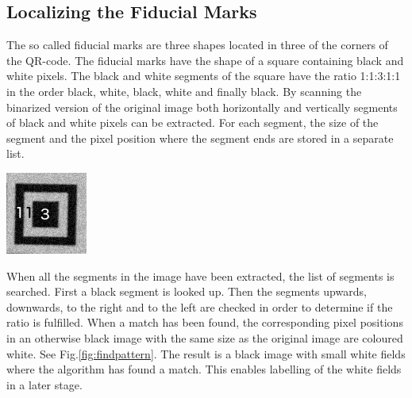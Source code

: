\documentclass[12pt,a4paper]{article}
\newenvironment{Figure}
  {\par\medskip\noindent\minipage{\linewidth}}
  {\endminipage\par\medskip}
\begin{document}
\subsection{Localizing the Fiducial Marks}
The so called fiducial marks are three shapes located in three of the corners of the QR-code. The fiducial marks have the shape of a square containing black and white pixels. The black and white segments of the square have the ratio 1:1:3:1:1 \cite{belussi} in the order black, white, black, white and finally black. By scanning the binarized version of the original image both horizontally and vertically segments of black and white pixels can be extracted. For each segment, the size of the segment and the pixel position where the segment ends are stored in a separate list. 
\begin{Figure}
  \centering
    \includegraphics[width=0.5\linewidth]{./img/Fiducial.png}
\end{Figure}

When all the segments in the image have been extracted, the list of segments is searched. First a black segment is looked up. Then the segments upwards, downwards, to the right and to the left are checked in order to determine if the ratio is fulfilled. When a match has been found, the corresponding pixel positions in an otherwise black image with the same size as the original image are coloured white. See Fig.\ref{fig:findpattern}. The result is a black image with small white fields where the algorithm has found a match. This enables labelling of the white fields in a later stage. 
\end{document}
